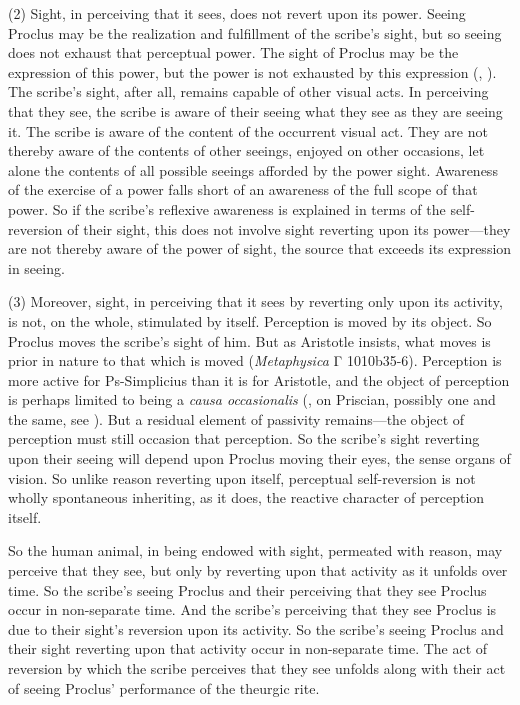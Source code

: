 (2) Sight, in perceiving that it sees, does not revert upon its power. Seeing Proclus may be the realization and fulfillment of the scribe's sight, but so seeing does not exhaust that perceptual power. The sight of Proclus may be the expression of this power, but the power is not exhausted by this expression (\citealt[210]{Gadamer:1960st}, \citeyear{Gadamer:1966ai}). The scribe's sight, after all, remains capable of other visual acts. In perceiving that they see, the scribe is aware of their seeing what they see as they are seeing it. The scribe is aware of the content of the occurrent visual act. They are not thereby aware of the contents of other seeings, enjoyed on other occasions, let alone the contents of all possible seeings afforded by the power sight. Awareness of the exercise of a power falls short of an awareness of the full scope of that power. So if the scribe's reflexive awareness is explained in terms of the self-reversion of their sight, this does not involve sight reverting upon its power—they are not thereby aware of the power of sight, the source that exceeds its expression in seeing.

(3) Moreover, sight, in perceiving that it sees by reverting only upon its activity, is not, on the whole, stimulated by itself. Perception is moved by its object. So Proclus moves the scribe's sight of him. But as Aristotle insists, what moves is prior in nature to that which is moved (\emph{Metaphysica} {\sbl Γ} 1010b35-6). Perception is more active for Ps-Simplicius than it is for Aristotle, and the object of perception is perhaps limited to being a \emph{causa occasionalis} (\citealt{Lautner:1994cs}, on Priscian, possibly one and the same, see \citealt{Kalderon:2017rw}). But a residual element of passivity remains—the object of perception must still occasion that perception. So the scribe's sight reverting upon their seeing will depend upon Proclus moving their eyes, the sense organs of vision. So unlike reason reverting upon itself, perceptual self-reversion is not wholly spontaneous inheriting, as it does, the reactive character of perception itself.

So the human animal, in being endowed with sight, permeated with reason, may perceive that they see, but only by reverting upon that activity as it unfolds over time. So the scribe's seeing Proclus and their perceiving that they see Proclus occur in non-separate time. And the scribe's perceiving that they see Proclus is due to their sight's reversion upon its activity. So the scribe's seeing Proclus and their sight reverting upon that activity occur in non-separate time. The act of reversion by which the scribe perceives that they see unfolds along with their act of seeing Proclus' performance of the theurgic rite. 

